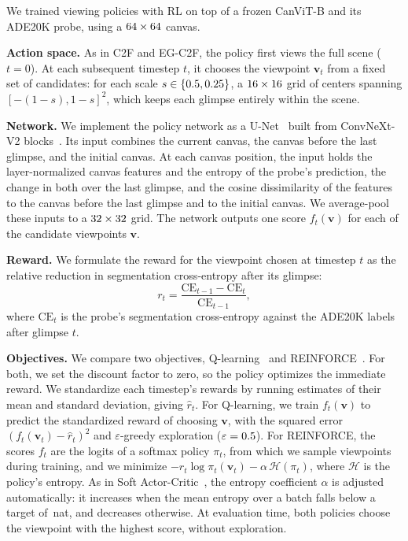 \documentclass{article}
\begin{document}
We trained viewing policies with \ac{RL} on top of a frozen CanViT-B and its ADE20K probe, using a $64 \times 64$ canvas.

\textbf{Action space.} As in C2F and EG-C2F, the policy first views the full scene ($t = 0$).
At each subsequent timestep $t$, it chooses the viewpoint $\mathbf{v}_t$ from a fixed set of \rlCandidates{} candidates: for each scale $s \in \{0.5, 0.25\}$, a $16 \times 16$ grid of centers spanning $[-(1-s), 1-s]^2$, which keeps each glimpse entirely within the scene.

\textbf{Network.} We implement the policy network as a U-Net~\cite{ronnebergerUNetConvolutionalNetworks2015} built from ConvNeXt-V2 blocks~\cite{wooConvNeXtV2Codesigning2023}.
Its input combines the current canvas, the canvas before the last glimpse, and the initial canvas.
At each canvas position, the input holds the layer-normalized canvas features and the entropy of the probe's prediction, the change in both over the last glimpse, and the cosine dissimilarity of the features to the canvas before the last glimpse and to the initial canvas.
We average-pool these inputs to a $32 \times 32$ grid.
The network outputs one score $f_t(\mathbf{v})$ for each of the \rlCandidates{} candidate viewpoints $\mathbf{v}$.

\textbf{Reward.} We formulate the reward for the viewpoint chosen at timestep $t$ as the relative reduction in segmentation cross-entropy after its glimpse:
\begin{equation}
  r_t = \frac{\mathrm{CE}_{t-1} - \mathrm{CE}_t}{\mathrm{CE}_{t-1}},
\end{equation}
where $\mathrm{CE}_t$ is the probe's segmentation cross-entropy against the ADE20K labels after glimpse $t$.

\textbf{Objectives.} We compare two objectives, Q-learning~\cite{watkinsQlearning1992} and REINFORCE~\cite{williamsSimpleStatisticalGradientfollowing1992}.
For both, we set the discount factor to zero, so the policy optimizes the immediate reward.
We standardize each timestep's rewards by running estimates of their mean and standard deviation, giving $\hat{r}_t$.
For \mbox{Q-learning}, we train $f_t(\mathbf{v})$ to predict the standardized reward of choosing $\mathbf{v}$, with the squared error $(f_t(\mathbf{v}_t) - \hat{r}_t)^2$ and $\varepsilon$-greedy exploration ($\varepsilon = 0.5$).
For REINFORCE, the scores $f_t$ are the logits of a softmax policy $\pi_t$, from which we sample viewpoints during training, and we minimize $-\hat{r}_t \log \pi_t(\mathbf{v}_t) - \alpha\,\mathcal{H}(\pi_t)$, where $\mathcal{H}$ is the policy's entropy.
As in Soft Actor-Critic~\cite{haarnojaSoftActorCriticAlgorithms2018}, the entropy coefficient $\alpha$ is adjusted automatically: it increases when the mean entropy over a batch falls below a target of \rlEntropyFloor{}\,nat, and decreases otherwise.
At evaluation time, both policies choose the viewpoint with the highest score, without exploration.
\end{document}
